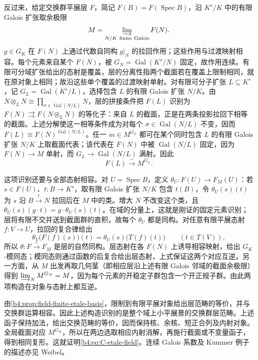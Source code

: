 \begin{proofsketch}
	反过来，给定交换群平展层 \(F\)，简记 \(F(B)=F(\operatorname{Spec}B)\)，沿 \(K^s/K\) 中的有限 Galois 扩张取余极限
	\[
		M=\varinjlim_{N/K\ {\rm finite\ Galois}}F(N).
	\]
	\(g\in G_K\) 在 \(F(N)\) 上通过代数自同构 \(g|_N\) 的拉回作用；这些作用与过渡映射相容。每个元素来自某个 \(F(N)\)，被 \(G_N=\operatorname{Gal}(K^s/N)\) 固定，故作用连续。有限可分域扩张给出的态射是覆盖，层的分离性指两个截面若在覆盖上限制相同，就在原对象上相同；故沿这些单个覆盖的过渡映射单射。对有限可分子扩张 \(L\subseteq K^s\)，记 \(G_L=\operatorname{Gal}(K^s/L)\)，选择包含 \(L\) 的有限 Galois 扩张 \(N/K\)。由 \(N\otimes_LN\cong\prod_{\sigma\in\operatorname{Gal}(N/L)}N\)，层的拼接条件把 \(F(L)\) 识别为 \(F(N)\rightrightarrows F(N\otimes_LN)\) 的等化子：来自 \(L\) 的截面，正是在两条投影拉回下相等的截面。上述分解使这一相等条件成为对每个 \(\sigma\in\operatorname{Gal}(N/L)\) 不变，因而 \(F(L)\cong F(N)^{\operatorname{Gal}(N/L)}\)。任一 \(m\in M^{G_L}\) 都可在某个同时包含 \(L\) 的有限 Galois 扩张 \(N/K\) 上取截面代表；该代表在 \(F(N)\) 中被 \(\operatorname{Gal}(N/L)\) 固定，因为 \(F(N)\to M\) 单射，而 \(G_L\to\operatorname{Gal}(N/L)\) 满射。因此
	\[
		F(L)\xrightarrow{\sim}M^{G_L}.
	\]

	这项识别还要与全部态射相容。对 \(U=\operatorname{Spec}B\)，定义 \(\theta_U:F(U)\to F_M(U)\)：若 \(s\in F(U)\)、\(t:B\to K^s\)，取有限 Galois 扩张 \(N/K\) 包含 \(t(B)\)，令 \(\theta_U(s)(t)\) 为 \(s\) 沿 \(B\xrightarrow{t}N\) 拉回后在 \(M\) 中的类。增大 \(N\) 不改变这个类，且 \(\theta_U(s)(g\cdot t)=g\cdot\theta_U(s)(t)\)。在域的分量上，这就是刚证的固定元素识别；层将有限不交并送到截面群的直积，故每个 \(\theta_U\) 都是同构。对任意有限平展态射 \(f:V\to U\)，拉回的复合律给出
	\[
		\theta_V\bigl(F(f)(s)\bigr)(t) =\theta_U(s)\bigl(T(f)(t)\bigr) \qquad(t\in T(V)),
	\]
	所以 \(\theta:F\xrightarrow{\sim}F_M\) 是层的自然同构。层态射在各 \(F(N)\) 上诱导相容映射，给出 \(G_K\)-模同态；模同态则通过函数的后复合给出层态射，上式保证这两个对应互逆。另一方面，从 \(M\) 出发再取几何茎（即相应层沿上述有限 Galois 邻域的截面余极限）得到 \(\varinjlim_N M^{G_N}=M\)，因为每个元素的开稳定子群包含一个开正规子群。由此两项构造在对象与态射上都互逆。

	由\cref{b4:prop:field-finite-etale-basis}，限制到有限平展对象给出层范畴的等价，并与交换群运算相容。因此上述构造识别的是整个域上小平展景的交换群层范畴。上述函子保持加法，给出交换范畴的等价，因而保持核、余核、短正合列及内射对象。全局截面对应 \(M^{G_K}\)，所以在两边选取相应内射消解，再施行截面或不变量函子，得到相同复形。这就证明\eqref{b4:eq:C-etale-field}。连续 Galois 系数及 Kummer 例子的描述亦见 Weibel\cite[Chapter III, Sketch 6.10 and Example 6.10.1, pp. 241--242]{Weibel2013KBook}。
\end{proofsketch}

